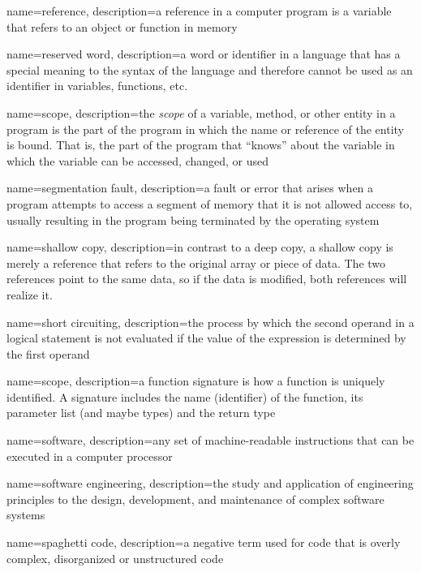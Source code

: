 {
  name=reference,
  description={a reference in a computer program is a variable that refers to an object or function in memory}
}

{
  name=reserved word,
  description={a word or identifier in a language that has a special meaning to the syntax of the language and 
  	therefore cannot be used as an identifier in variables, functions, etc.}
}

{
  name=scope,
  description={the \emph{scope} of a variable, method, or other entity in a program
  	is the part of the program in which the name or reference of the entity is bound.
	That is, the part of the program that ``knows'' about the variable in which the variable
	can be accessed, changed, or used}
}

{
  name=segmentation fault,
  description={a fault or error that arises when a program attempts to access a segment of memory that it is not allowed access to, usually resulting in the program being terminated by the operating system}
}

{
  name=shallow copy,
  description={in contrast to a deep copy, a shallow copy is merely a reference that refers to the original array or piece of data.  The two references point to the same data, so if the data is modified, both references will realize it.}
}

{
  name=short circuiting,
  description={the process by which the second operand in a logical statement is not evaluated if the
  	value of the expression is determined by the first operand}
}

{
  name=scope,
  description={a function signature is how a function is uniquely identified.  A signature includes the name (identifier) of the function, its parameter list (and maybe types) and the return type}
}

{
  name=software,
  description={any set of machine-readable instructions that can be executed in a computer processor}
}

{
  name=software engineering,
  description={the study and application of engineering principles to the design, development, and maintenance of complex software systems}
}

{
  name=spaghetti code,
  description={a negative term used for code that is overly complex, disorganized or unstructured code}
}


